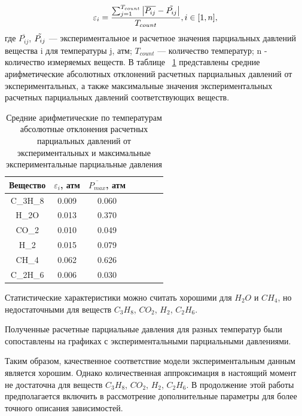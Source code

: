 \documentclass{cmi}
\begin{document}
\begin{equation}\label{eq15}
\varepsilon_{i}=\frac{\sum_{j=1}^{T_{count}}\left|\overline{P_{ij}}-\Tilde{P_{ij}}\right|}{T_{count}}, i \in [1, n],
\end{equation}
где $\overline{P_{ij}}$, $\Tilde{P_{ij}}$ --- экспериментальное и расчетное значения парциальных давлений вещества i для температуры j, атм; $T_{count}$ --- количество температур; n - количество измеряемых веществ. В таблице ~\ref{tab:abs_error} представлены средние арифметические абсолютных отклонений расчетных парциальных давлений от экспериментальных, а также максимальные значения экспериментальных расчетных парциальных давлений соответствующих веществ.
\begin{table}[h]
\noindent
\caption{Средние арифметические по температурам абсолютные отклонения расчетных парциальных давлений от экспериментальных и максимальные экспериментальные парциальные давления}
\label{tab:abs_error}
\centering
\begin{tabular}{|c|c|c|c|c|c|c|}
\hline
\textbf{Вещество} & \textbf{$\varepsilon_{i}$, атм} & \textbf{$\overline{P_{max}}$, атм} \\
\hline
C_{3}H_{8}  & 0.009   & 0.060 \\
H_{2}O      & 0.013   & 0.370 \\
CO_{2}      & 0.010   & 0.049 \\
H_{2}       & 0.015   & 0.079 \\
CH_{4}      & 0.062   & 0.626 \\
C_{2}H_{6}  & 0.006   & 0.030 \\
\hline
\end{tabular}
\end{table}

Статистические характеристики можно считать хорошими для $H_{2}O$ и $CH_{4}$, но недостаточными для веществ $C_3H_8$, $CO_2$, $H_2$, $C_2H_6$.

Полученные расчетные парциальные давления для разных температур были сопоставлены на графиках с экспериментальными парциальными давлениями.


Таким образом, качественное соответствие модели экспериментальным данным является хорошим. Однако количественная аппроксимация в настоящий момент не достаточна для веществ $C_3H_8$, $CO_2$, $H_2$, $C_2H_6$. В продолжение этой работы предполагается включить в рассмотрение дополнительные параметры для более точного описания зависимостей.
\end{document}
